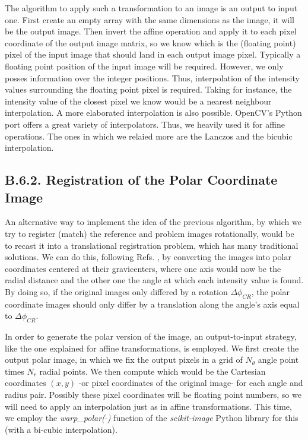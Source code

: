 \documentclass[11pt, a4paper, twoside]{article} %
\begin{document}
{The algorithm to apply such a transformation to an image is an output to input one. First create an empty array with the same dimensions as the image, it will be the output image. Then invert the affine operation and apply it to each pixel coordinate of the output image matrix, so we know which is the (floating point) pixel of the input image that should land in each output image pixel. Typically a floating point position of the input image will be required. However, we only posses information over the integer positions. Thus, interpolation of the intensity values surrounding the floating point pixel is required. Taking for instance, the intensity value of the closest pixel we know would be a nearest neighbour interpolation. A more elaborated interpolation is also possible. OpenCV's Python port \cite{cv2} offers a great variety of interpolators. Thus, we heavily used it for affine operations. The ones in which we relaied more are the Lanczos \cite{Lanczos} and the bicubic interpolation.

}

\subsection*{B.6.2. Registration of the Polar Coordinate Image}
An alternative way to implement the idea of the previous algorithm, by which we try to register (match) the reference and problem images rotationally, would be to recast it into a translational registration problem, which has many traditional solutions. We can do this, following Refs. \cite{phase,phase2}, by converting the images into polar coordinates centered at their gravicenters, where one axis would now be the radial distance and the other one the angle at which each intensity value is found. By doing so, if the original images only differed by a rotation $\Delta\phi_{CR}$, the polar coordinate images should only differ by a translation along the angle's axis equal to $\Delta\phi_{CR}$.

In order to generate the polar version of the image, an output-to-input strategy, like the one explained for affine transformations, is employed. We first create the output polar image, in which we fix the output pixels in a grid of $N_\theta$ angle point times $N_r$ radial points. We then compute which would be the Cartesian coordinates $(x,y)$ -or pixel coordinates of the original image- for each angle and radius pair. Possibly these pixel coordinates will be floating point numbers, so we will need to apply an interpolation just as in affine transformations. This time, we employ the {\em warp\_polar($\cdot$)} function of the {\em scikit-image} Python library \cite{skimage} for this (with a bi-cubic interpolation).
\end{document}
